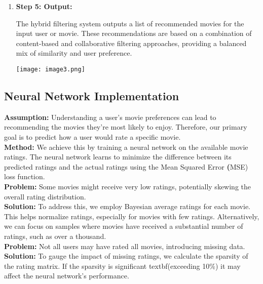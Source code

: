 \documentclass[a4paper]{article}
\theoremstyle{plain}
\theoremstyle{definition}
\begin{document}
\begin{enumerate}
            \item \textbf{Step 5: Output:}
            
            The hybrid filtering system outputs a list of recommended movies for the input user or movie. These recommendations are based on a combination of content-based and collaborative filtering approaches, providing a balanced mix of similarity and user preference.

            \texttt{[image: image3.png]} %
            
        \end{enumerate}

    \subsection{Neural Network Implementation}

\textbf{Assumption:}
Understanding a user's movie preferences can lead to recommending the movies they're most likely to enjoy. Therefore, our primary goal is to predict how a user would rate a specific movie.\\

\textbf{Method:}
We achieve this by training a neural network on the available movie ratings. The neural network learns to minimize the difference between its predicted ratings and the actual ratings using the Mean Squared Error {\textbf(MSE)} loss function.\\

\textbf{Problem:}
Some movies might receive very low ratings, potentially skewing the overall rating distribution.\\

\textbf{Solution:}
To address this, we employ Bayesian average ratings for each movie. This helps normalize ratings, especially for movies with few ratings. Alternatively, we can focus on samples where movies have received a substantial number of ratings, such as over a thousand.\\

\textbf{Problem:}
Not all users may have rated all movies, introducing missing data.\\

\textbf{Solution:}
To gauge the impact of missing ratings, we calculate the sparsity of the rating matrix. If the sparsity is significant {textbf(exceeding 10\%)} it may affect the neural network's performance. 
\end{document}
